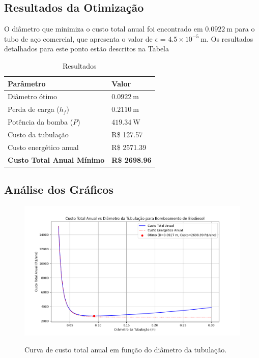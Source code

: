 \documentclass[12pt, a4paper]{article}
\begin{document}
        \subsection{Resultados da Otimização}
            O diâmetro que minimiza o custo total anual foi encontrado em \textbf{$0.0922~\mathrm{m}$} para o tubo de aço comercial, que apresenta o valor de $\epsilon$ = $4.5 \times 10^{-5}~\mathrm{m}$. Os resultados detalhados para este ponto estão descritos na Tabela
            \begin{table}[H]
                \centering
                \caption{Resultados}
                \label{tab:resultados caso1}
                \begin{tabular}{l l}
                    \toprule
                    \textbf{Parâmetro} & \textbf{Valor} \\
                    \midrule
                    Diâmetro ótimo & $0.0922~\mathrm{m}$ \\
                    Perda de carga ($h_f$) & $0.2110~\mathrm{m}$ \\
                    Potência da bomba ($P$) & $419.34~\mathrm{W}$ \\
                    Custo da tubulação & R\$ 127.57 \\
                    Custo energético anual & R\$ 2571.39 \\
                    \midrule
                    \textbf{Custo Total Anual Mínimo} & \textbf{R\$ 2698.96} \\
                    \bottomrule
                \end{tabular}
            \end{table}



        \subsection{Análise dos Gráficos}
            \begin{figure}[H]
                    \centering
                    \caption{Curva de custo total anual em função do diâmetro da tubulação.}
                    \includegraphics[width=1.0\textwidth, height=0.4\textheight, keepaspectratio]{custo_por_diametro.png}
                    \label{fig:custos_grafico}
            \end{figure}
\end{document}
